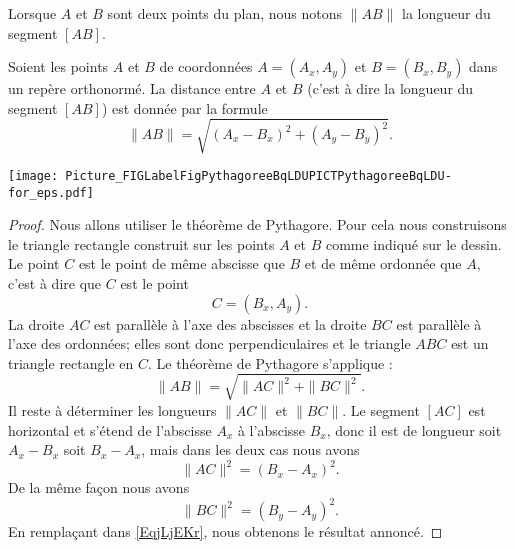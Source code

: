 Lorsque \( A\) et \( B\) sont deux points du plan, nous notons \( \| AB \|\) la longueur du segment \( [AB]\).
    \begin{Aretenir}
\begin{multicols}{2}
        Soient les points \( A\) et \( B\) de coordonnées \( A=(A_x,A_y)\) et \( B=(B_x,B_y)\) dans un repère orthonormé. La distance entre \( A\) et \( B\) (c'est à dire la longueur du segment \( [AB]\)) est donnée par la formule
        \begin{equation}
            \| AB \|=\sqrt{(A_x-B_x)^2+(A_y-B_y)^2}.
        \end{equation}
    
\columnbreak

\phantom{a} %

\vfill

\texttt{[image: Picture\_FIGLabelFigPythagoreeBqLDUPICTPythagoreeBqLDU-for\_eps.pdf]}

\end{multicols}
    \end{Aretenir}

%

\begin{proof}
    Nous allons utiliser le théorème de Pythagore. Pour cela nous construisons le triangle rectangle construit sur les points \( A\) et \( B\) comme indiqué sur le dessin. Le point \( C\) est le point de même abscisse que \( B\) et de même ordonnée que \( A\), c'est à dire que \( C\) est le point
    \begin{equation}
        C=(B_x,A_y).
    \end{equation}
    La droite \( AC\) est parallèle à l'axe des abscisses et la droite \( BC\) est parallèle à l'axe des ordonnées; elles sont donc perpendiculaires et le triangle \( ABC\) est un triangle rectangle en \( C\). Le théorème de Pythagore s'applique :
    \begin{equation}    \label{EqjLjEKr}
        \| AB \|=\sqrt{\| AC \|^2+\| BC \|^2}.
    \end{equation}
    Il reste à déterminer les longueurs \( \| AC \|\) et \( \| BC \|\). Le segment \( [AC]\) est horizontal et s'étend de l'abscisse \( A_x\) à l'abscisse \( B_x\), donc il est de longueur soit \( A_x-B_x\) soit \( B_x-A_x\), mais dans les deux cas nous avons
    \begin{equation}
        \| AC \|^2=(B_x-A_x)^2.
    \end{equation}
    De la même façon nous avons 
    \begin{equation}
        \| BC \|^2=(B_y-A_y)^2.
    \end{equation}
    En remplaçant dans \eqref{EqjLjEKr}, nous obtenons le résultat annoncé.
\end{proof}

